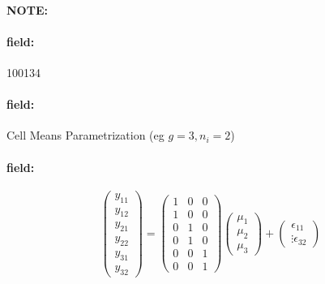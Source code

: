 \documentclass[12pt]{article}
\newenvironment{note}{\paragraph{NOTE:}}{}
\newenvironment{field}{\paragraph{field:}}{}
\begin{document}
\begin{note}
    \begin{field}
        \tiny 100134
    \end{field}
    \begin{field}
        Cell Means Parametrization
        (eg $g = 3, n_i = 2$)
    \end{field}
    \begin{field}
        $$ \begin{pmatrix}
              y_{11} \\ y_{12} \\ y_{21} \\ y_{22} \\ y_{31} \\y_{32}
        \end{pmatrix}  = \begin{pmatrix}
              1 & 0 & 0 \\
              1 & 0 & 0 \\
              0 & 1 & 0 \\
              0 & 1 & 0 \\
              0 & 0 & 1 \\
              0 & 0 & 1
        \end{pmatrix} \begin{pmatrix}
              \mu_{1} \\ \mu_2 \\ \mu_3
        \end{pmatrix} + \begin{pmatrix}
              \epsilon_{11} \\ \vdots \epsilon_{32}
        \end{pmatrix}$$
    \end{field}
\end{note}
\end{document}
